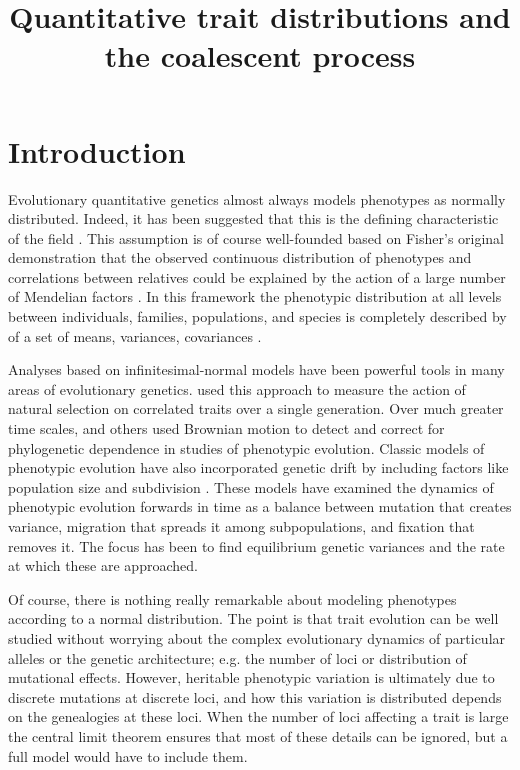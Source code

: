 \documentclass{article}
\begin{document}
\title{Quantitative trait distributions and the coalescent process}
\maketitle

\section{Introduction}
Evolutionary quantitative genetics almost always models phenotypes as normally
distributed. Indeed, it has been suggested that this is the defining
characteristic of the field \citep{Rice2004}. This assumption is of course
well-founded based on Fisher's original demonstration that the observed
continuous distribution of phenotypes and correlations between relatives could
be explained by the action of a large number of Mendelian factors
\citep{Fisher1918}. In this framework the phenotypic distribution at all levels
between individuals, families, populations, and species is completely described
by of a set of means, variances, covariances \citep{Falconer1996}.

Analyses based on infinitesimal-normal models have been powerful tools in many
areas of evolutionary genetics. \citet{Lande1983} used this approach to measure
the action of natural selection on correlated traits over a single generation.
Over much greater time scales, \citet{Freckleton2002} and others used Brownian
motion to detect and correct for phylogenetic dependence in studies of
phenotypic evolution. Classic models of phenotypic evolution have also
incorporated genetic drift by including factors like population size and
subdivision \citep{Chakraborty1982,Lynch1986,Lande1992}. These models have
examined the dynamics of phenotypic evolution forwards in time as a balance
between mutation that creates variance, migration that spreads it among
subpopulations, and fixation that removes it. The focus has been to find
equilibrium genetic variances and the rate at which these are approached.

Of course, there is nothing really remarkable about modeling phenotypes
according to a normal distribution. The point is that trait evolution can be
well studied without worrying about the complex evolutionary dynamics of
particular alleles or the genetic architecture; e.g. the number of loci or
distribution of mutational effects. However, heritable phenotypic variation is
ultimately due to discrete mutations at discrete loci, and how this variation is
distributed depends on the genealogies at these loci. When the number of loci
affecting a trait is large the central limit theorem ensures that most of these
details can be ignored, but a full model would have to include them.
\end{document}
